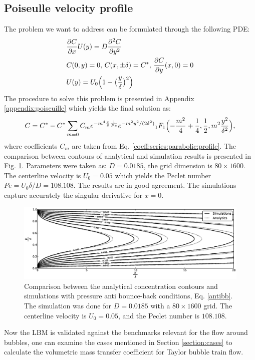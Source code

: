 \documentclass[preprint,12pt]{elsarticle}
\newcommand{\beq}{\begin{equation}}
\newcommand{\feq}{\end{equation}}
\newcommand{\cstar}{C^{*}}
\begin{document}
\subsection{Poiseulle velocity profile}
The problem we want to address can be formulated through the following PDE:
\beq
\begin{aligned}
&\frac{\partial C}{\partial x} U(y)=D\frac{\partial^2 C}{\partial y^2}\\
&C(0,y)=0,\, C(x,\pm \delta)=\cstar,\, \frac{\partial C}{\partial y }(x,0)=0\\
&U(y)=U_0 \Bigl(1-\bigl(\frac{y}{\delta}\bigr)^2\Bigr)
\end{aligned}
\feq
The procedure to solve this problem is presented in Appendix \ref{appendix:poiseuille} which yields
the final solution as:
\begin{equation}
C=\cstar-\cstar \sum_{m=0}{C_m e^{-m^4 \frac{x}{\delta}\frac{1}{Pe}} e^{-m^2
y^2/(2\delta^2)}{_1F_1}\Bigl(-\frac{m^2}{4}+\frac{1}{4},\frac{1}{2},m^2 \frac{y^2}{\delta^2}\Bigr)},
\end{equation}
where coefficients $C_m$ are taken from Eq. \ref{coeff:series:parabolic:profile}. The comparison
between contours of analytical and simulation results is presented in Fig.
\ref{fig:parabolic:comparison}. Parameters were taken as: $D=0.0185$, the grid dimension is $80\times1600$. The centerline velocity is  $U_0=0.05$
which yields the Peclet number $Pe=U_0 \delta / D= 108.108$.
The results are in good agreement. The simulations capture accurately the singular derivative for $x=0$.
\begin{figure}[htb!]
\includegraphics[width=\textwidth]{Figures/parabolic_profile_comparison.eps}
\caption{Comparison between the analytical concentration contours and simulations with pressure
anti bounce-back conditions, Eq. \ref{antibb}. The simulation was done for $D=0.0185$ with a
$80\times1600$ grid. The centerline velocity is $U_0=0.05$, and the Peclet number is $108.108$. \label{fig:parabolic:comparison}}
\end{figure}

Now the LBM is validated against the benchmarks relevant for the flow around bubbles, one can
examine the cases mentioned in Section
\ref{section:cases} to calculate the volumetric mass transfer coefficient for Taylor bubble train flow.
\end{document}
